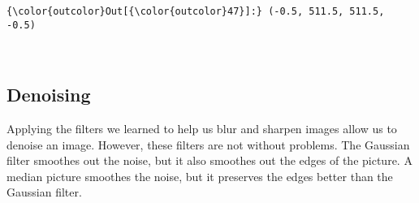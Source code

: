 \documentclass{article}
\begin{document}
            \begin{Verbatim}[commandchars=\\\{\}]
{\color{outcolor}Out[{\color{outcolor}47}]:} (-0.5, 511.5, 511.5, -0.5)
\end{Verbatim}
        
    \begin{center}
    \end{center}
    { \hspace*{\fill} \\}
    
    \subsection{Denoising}\label{denoising}

    Applying the filters we learned to help us blur and sharpen images allow
us to denoise an image. However, these filters are not without problems.
The Gaussian filter smoothes out the noise, but it also smoothes out the
edges of the picture. A median picture smoothes the noise, but it
preserves the edges better than the Gaussian filter.
\end{document}
